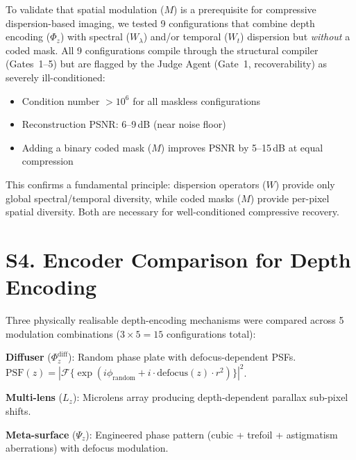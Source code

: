 \documentclass[11pt,a4paper]{article}
\begin{document}
To validate that spatial modulation ($M$) is a prerequisite for compressive dispersion-based imaging, we tested 9 configurations that combine depth encoding ($\Phi_z$) with spectral ($W_\lambda$) and/or temporal ($W_t$) dispersion but \emph{without} a coded mask.  All 9 configurations compile through the structural compiler (Gates~1--5) but are flagged by the Judge Agent (Gate~1, recoverability) as severely ill-conditioned:

\begin{itemize}[nosep]
\item Condition number $> 10^6$ for all maskless configurations
\item Reconstruction PSNR: 6--9\,dB (near noise floor)
\item Adding a binary coded mask ($M$) improves PSNR by 5--15\,dB at equal compression
\end{itemize}

This confirms a fundamental principle: dispersion operators ($W$) provide only global spectral/temporal diversity, while coded masks ($M$) provide per-pixel spatial diversity.  Both are necessary for well-conditioned compressive recovery.

\section{S4. Encoder Comparison for Depth Encoding}

Three physically realisable depth-encoding mechanisms were compared across 5 modulation combinations ($3 \times 5 = 15$ configurations total):

\textbf{Diffuser} ($\Phi_z^{\text{diff}}$): Random phase plate with defocus-dependent PSFs.  $\text{PSF}(z) = |\mathcal{F}\{\exp(i\phi_{\text{random}} + i \cdot \text{defocus}(z) \cdot r^2)\}|^2$.

\textbf{Multi-lens} ($L_z$): Microlens array producing depth-dependent parallax sub-pixel shifts.

\textbf{Meta-surface} ($\Psi_z$): Engineered phase pattern (cubic + trefoil + astigmatism aberrations) with defocus modulation.
\end{document}
